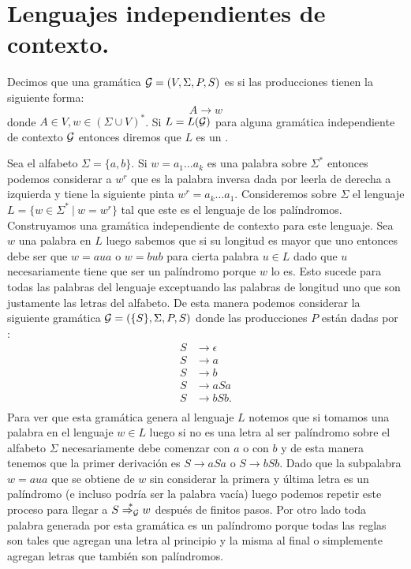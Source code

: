 \documentclass[tesis.tex]{subfiles}
\newcommand{\gramatica}{{\cal G} = (V, \Sigma, P, S)}
\newcommand{\deriva}{\overset{*}{\Rightarrow_{\cal G}}}
\newcommand{\lengderivado}{L({\cal G})}
\begin{document}
\section{Lenguajes independientes de contexto.}
\begin{deff}
	Decimos que una gramática $\gramatica $ es  si las producciones tienen la siguiente forma:
	\begin{equation*}
	A \to w
	\end{equation*}
	donde $A \in V, w \in (\Sigma \cup V)^*$.  
	Si $L=\lengderivado$ para alguna gramática independiente de contexto $\cal G$ entonces diremos que $L$ es un .
\end{deff}


\begin{ej}
	Sea el alfabeto $\Sigma = \{ a,b \}$. Si $w=a_1 \dots a_k$ es una palabra sobre $\Sigma^*$ entonces podemos considerar a $w^r$ que es la palabra inversa dada por leerla de derecha a izquierda y tiene la siguiente pinta $w^r= a_k \dots a_1$. 
	Consideremos sobre $\Sigma$ el lenguaje $L = \{ w \in \Sigma^* \ | \ w = w^r  \}$ tal que este es el lenguaje de los palíndromos. 
	Construyamos una gramática independiente de contexto para este lenguaje.
	Sea $w$ una palabra en $L$ luego sabemos que si su longitud es mayor que uno entonces debe ser que $w = a u a$ o $w = b u b$ para cierta palabra $u \in L$ dado que $u$ necesariamente tiene que ser un palíndromo porque $w$ lo es. 
	Esto sucede para todas las palabras del lenguaje exceptuando las palabras de longitud uno que son justamente las letras del alfabeto. 
	De esta manera podemos considerar la siguiente gramática ${\cal G}  =  (\{S\}, \Sigma, P, S )$ donde las producciones $P$ están dadas por :
	\begin{align*}
	S  & \to \epsilon \\ S &\to a \\ S &\to b \\ S &\to  aSa \\ S &\to bSb. \\
	\end{align*}
	Para ver que esta gramática genera al lenguaje $L$ notemos que si tomamos una palabra en el lenguaje $w \in L$ luego si no es una letra al ser palíndromo sobre el alfabeto $\Sigma$ necesariamente debe comenzar con $a$ o con $b$ y de esta manera tenemos que la primer derivación es $S \to aSa$ o $S \to bSb$. 
	Dado que la subpalabra $w = aua$ que se obtiene de $w$ sin considerar la primera y última letra es un palíndromo (e incluso podría ser la palabra vacía) luego podemos repetir este proceso para llegar a $S \deriva w$ después de finitos pasos. 
	Por otro lado toda palabra generada por esta gramática es un palíndromo porque todas las reglas son tales que agregan una letra al principio y la misma al final o simplemente agregan letras que también son palíndromos.
	
\end{ej}
\end{document}
